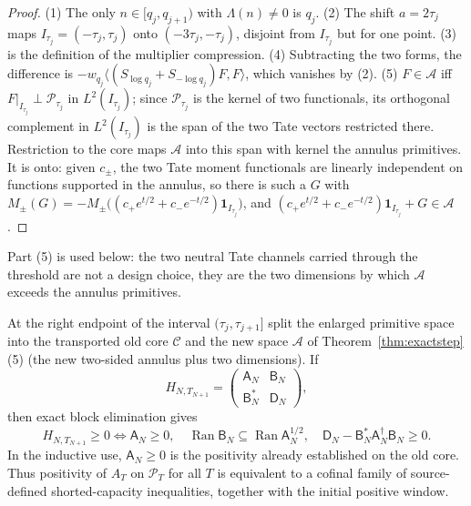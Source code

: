 \documentclass[11pt]{amsart}
\theoremstyle{definition}
\theoremstyle{remark}
\begin{document}
\begin{proof}
(1) The only \(n\in[q_j,q_{j+1})\) with \(\Lambda(n)\ne0\) is \(q_j\).
(2) The shift \(a=2\tau_j\) maps \(I_{\tau_j}=(-\tau_j,\tau_j)\) onto
\((-3\tau_j,-\tau_j)\), disjoint from \(I_{\tau_j}\) but for one point.
(3) is the definition of the multiplier compression.  (4) Subtracting the two
forms, the difference is
\(-w_{q_j}\langle(S_{\log q_j}+S_{-\log q_j})F,F\rangle\), which vanishes by
(2).  (5) \(F\in\mathcal A\) iff \(F|_{I_{\tau_j}}\perp\mathcal P_{\tau_j}\)
in \(L^2(I_{\tau_j})\); since \(\mathcal P_{\tau_j}\) is the kernel of two
functionals, its orthogonal complement in \(L^2(I_{\tau_j})\) is the span of
the two Tate vectors restricted there.  Restriction to the core maps
\(\mathcal A\) into this span with kernel the annulus primitives.  It is onto:
given \(c_\pm\), the two Tate moment functionals are linearly independent on
functions supported in the annulus, so there is such a \(G\) with
\(M_\pm(G)=-M_\pm\bigl((c_+e^{t/2}+c_-e^{-t/2})\mathbf 1_{I_{\tau_j}}\bigr)\),
and \((c_+e^{t/2}+c_-e^{-t/2})\mathbf 1_{I_{\tau_j}}+G\in\mathcal A\).
\end{proof}

Part (5) is used below: the two neutral Tate channels carried through the
threshold are not a design choice, they are the two dimensions by which
\(\mathcal A\) exceeds the annulus primitives.

At the right endpoint of the interval \((\tau_j,\tau_{j+1}]\) split the
enlarged primitive space into the transported old core \(\mathcal C\) and the
new space \(\mathcal A\) of Theorem~\ref{thm:exactstep}(5) (the new
two-sided annulus plus two dimensions).  If
\[
 H_{N,T_{N+1}}=\begin{pmatrix}\mathsf A_N&\mathsf B_N\\\mathsf B_N^*&\mathsf D_N\end{pmatrix},
\]
then exact block elimination gives
\begin{equation}\label{eq:thresholdcapacity}
 H_{N,T_{N+1}}\ge0
 \Longleftrightarrow
 \mathsf A_N\ge0,\quad
 \operatorname{Ran}\mathsf B_N\subseteq\operatorname{Ran}\mathsf A_N^{1/2},
 \quad \mathsf D_N-\mathsf B_N^*\mathsf A_N^\dagger \mathsf B_N\ge0.
\end{equation}
In the inductive use, \(\mathsf A_N\ge0\) is the positivity already established on
the old core.  Thus positivity of \(A_T\) on \(\mathcal P_T\) for all \(T\) is
equivalent to a cofinal family of source-defined
shorted-capacity inequalities, together with the initial positive window.
\end{document}
